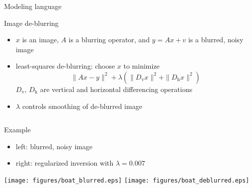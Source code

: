 \documentclass[11pt,mathserif]{beamer}
\begin{document}
\begin{frame}{Modeling language}
\vfill
{}
\vfill
\end{frame}

\begin{frame}{Image de-blurring}
\begin{itemize}
\item $x$ is an image, $A$ is a blurring operator, and $y=Ax+v$
is a blurred, noisy image
\item least-squares de-blurring: choose $x$ to minimize
\[
 \|Ax -  y\|^2 + \lambda (\|D_\mathrm v x\|^2 + \|D_\mathrm h x\|^2)
\]
$D_\mathrm v$, $D_\mathrm h$ are vertical and horizontal
differencing operations
\item $\lambda$ controls smoothing of de-blurred image
\inputminted{haskell}{app/example3.hs}
\end{itemize}

\end{frame}

\begin{frame}{Example}
\begin{itemize}
\item left: blurred, noisy image
\item right: regularized inversion with
$\lambda = 0.007$
\end{itemize}

\hspace*{\fill}
\texttt{[image: figures/boat\_blurred.eps]}
\hspace*{\fill}
\texttt{[image: figures/boat\_deblurred.eps]}
\hspace*{\fill}
\end{frame}
\end{document}
